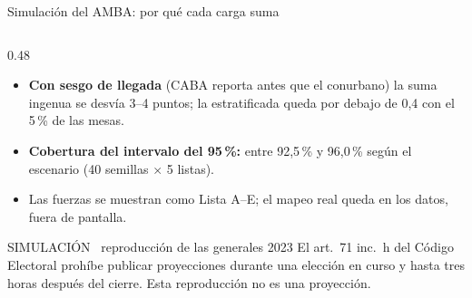 \documentclass[aspectratio=169,11pt]{beamer}
\begin{document}
\begin{frame}{Simulación del AMBA: por qué cada carga suma}
\begin{columns}[T]
\begin{column}{0.48\textwidth}
\begin{itemize}
        \item \textbf{Con sesgo de llegada} (CABA reporta antes que el conurbano) la suma ingenua se desvía 3--4 puntos;
              la estratificada queda por debajo de 0,4 con el 5\,\% de las mesas.
        \item \textbf{Cobertura del intervalo del 95\,\%:} entre 92,5\,\% y 96,0\,\% según el escenario (40 semillas $\times$ 5 listas).
        \item Las fuerzas se muestran como Lista A--E; el mapeo real queda en los datos, fuera de pantalla.
      \end{itemize}
      \begin{alertblock}{SIMULACIÓN \textperiodcentered\ reproducción de las generales 2023}
        \scriptsize El art.\ 71 inc.\ h del Código Electoral prohíbe publicar proyecciones durante una elección en curso y hasta tres horas después del cierre. Esta reproducción no es una proyección.
      \end{alertblock}
    \end{column}
  \end{columns}
\end{frame}
\end{document}
